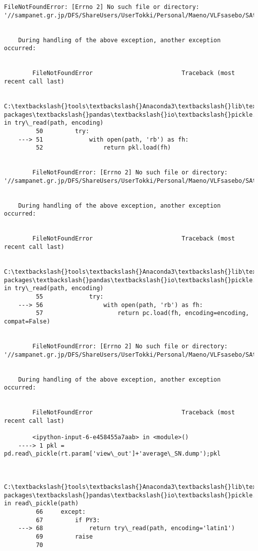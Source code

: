 \documentclass[a4paper,dvipdfmx]{jsarticle}
\begin{document}
\begin{Verbatim}[commandchars=\\\{\}]
        FileNotFoundError: [Errno 2] No such file or directory: '//sampanet.gr.jp/DFS/ShareUsers/UserTokki/Personal/Maeno/VLFsasebo/SAtraceViewResult/average\_SN.dump'

        
    During handling of the above exception, another exception occurred:
    

        FileNotFoundError                         Traceback (most recent call last)

        C:\textbackslash{}tools\textbackslash{}Anaconda3\textbackslash{}lib\textbackslash{}site-packages\textbackslash{}pandas\textbackslash{}io\textbackslash{}pickle.py in try\_read(path, encoding)
         50         try:
    ---> 51             with open(path, 'rb') as fh:
         52                 return pkl.load(fh)
    

        FileNotFoundError: [Errno 2] No such file or directory: '//sampanet.gr.jp/DFS/ShareUsers/UserTokki/Personal/Maeno/VLFsasebo/SAtraceViewResult/average\_SN.dump'

        
    During handling of the above exception, another exception occurred:
    

        FileNotFoundError                         Traceback (most recent call last)

        C:\textbackslash{}tools\textbackslash{}Anaconda3\textbackslash{}lib\textbackslash{}site-packages\textbackslash{}pandas\textbackslash{}io\textbackslash{}pickle.py in try\_read(path, encoding)
         55             try:
    ---> 56                 with open(path, 'rb') as fh:
         57                     return pc.load(fh, encoding=encoding, compat=False)
    

        FileNotFoundError: [Errno 2] No such file or directory: '//sampanet.gr.jp/DFS/ShareUsers/UserTokki/Personal/Maeno/VLFsasebo/SAtraceViewResult/average\_SN.dump'

        
    During handling of the above exception, another exception occurred:
    

        FileNotFoundError                         Traceback (most recent call last)

        <ipython-input-6-e458455a7aab> in <module>()
    ----> 1 pkl = pd.read\_pickle(rt.param['view\_out']+'average\_SN.dump');pkl
    

        C:\textbackslash{}tools\textbackslash{}Anaconda3\textbackslash{}lib\textbackslash{}site-packages\textbackslash{}pandas\textbackslash{}io\textbackslash{}pickle.py in read\_pickle(path)
         66     except:
         67         if PY3:
    ---> 68             return try\_read(path, encoding='latin1')
         69         raise
         70 
    


\end{Verbatim}
\end{document}
